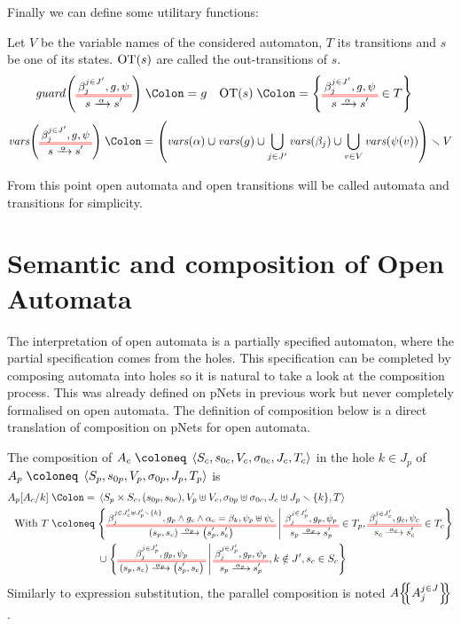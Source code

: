 \documentclass{article}
\begin{document}
Finally we can define some utilitary functions:
\begin{defi}
Let \(V\) be the variable names of the considered automaton, \(T\) its transitions and \(s\) be one of its states.
\(\mathrm{OT}{\left(s\right)}\) are called the out-transitions of \(s\).
\begin{align*}
	\fguard{\OTg} & \defnotation g &
	\fOT{s} & \defnotation \mbrc{\OTg \in T}
\end{align*}
\[ \fvars{\OTg} \defnotation \mpar{\fvars{\alpha} \cup \fvars{g} \cup \bigcup_{j \in J'} \fvars{\beta_j} \cup \bigcup_{v \in V} \fvars{\psi\mpar{v}}} \setminus V \]
\end{defi}
From this point open automata and open transitions will be called automata and transitions for simplicity.


\section{Semantic and composition of Open Automata}\label{sec:semcompo}
The interpretation of open automata is a partially specified automaton, where the partial specification comes from the holes.
This specification can be completed by composing automata into holes so it is natural to take a look at the composition process.
This was already defined on pNets in previous work \cite{henrio:01299562} but never completely formalised on open automata.
The  definition of composition below is a direct translation of composition on pNets for open automata.
\begin{defi}
The composition of \(A_c \defobject \OA{S_c}{s_{0c}}{V_c}{\sigma_{0c}}{J_c}{T_c}\) in the hole \(k \in J_p\) of \(A_p \defobject \OA{S_p}{s_{0p}}{V_p}{\sigma_{0p}}{J_p}{T_p}\) is
\begin{align*}
	A_p\subst{A_c}{k} \defnotation & \OA{S_p \times S_c}{\mpar{s_{0p}, s_{0c}}}{V_p \uplus V_c}{\sigma_{0p} \uplus \sigma_{0c}}{J_c \uplus J_p \setminus \mbrc{k}}{T} \\
	\text{With } T \defobject & \mset{\OT{\mpar{s_p, s_c}}{\mpar{s'_p, s'_c}}{\alpha_p}{\beta_j^{j \in J'_c \uplus J'_p \setminus \mbrc{k}}}{g_p \wedge g_c \wedge \alpha_c = \beta_k}{\psi_p \uplus \psi_c}}{\OTx{p}{}{}{p} \in T_p, \OTx{c}{}{}{c} \in T_c} \\
	& \cup \mset{\OT{\mpar{s_p, s_c}}{\mpar{s'_p, s_c}}{\alpha_p}{\beta_j^{j \in J'_p}}{g_p}{\psi_p}}{\OTx{p}{}{}{p}, k \notin J', s_c \in S_c}
\end{align*}
Similarly to expression substitution, the parallel composition is noted \(A{\left\{\!\!{\left\{A_j^{j \in J}\right\}}\!\!\right\}}\).
\end{defi}
\end{document}
